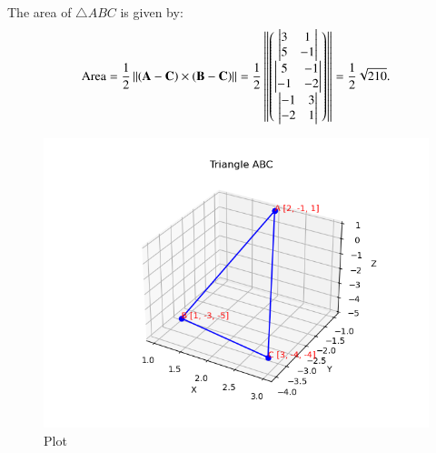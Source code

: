 \documentclass[12pt]{article}
\begin{document}
The area of \(\triangle ABC\) is given by:
\[
\text{Area} = \frac{1}{2} \left\| (\mathbf{A} - \mathbf{C}) \times (\mathbf{B} - \mathbf{C}) \right\| 
= \frac{1}{2} \left\|
\begin{pmatrix}
\left|
\begin{matrix}
3 & 1 \\
5 & -1
\end{matrix}
\right|
\\
\left|
\begin{matrix}
5 & -1 \\
-1 & -2
\end{matrix}
\right|
\\
\left|
\begin{matrix}
-1 & 3 \\
-2 & 1
\end{matrix}
\right|
\end{pmatrix}
\right\| 
= \frac{1}{2} \sqrt{210}.
\]

\begin{figure}[H]
	\centering
	\includegraphics[width = 0.8\columnwidth]{Figs/Figure_1.png}
	\caption{Plot}
    \label{fig:placeholder}
\end{figure}
\end{document}
